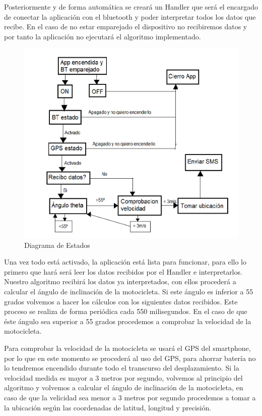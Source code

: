 		Posteriormente y de forma automática se creará un Handler que será el encargado de conectar la aplicación con el bluetooth y poder interpretar todos los datos que recibe. En el caso de no estar emparejado el dispositivo no recibiremos datos y por tanto la aplicación no ejecutará el algoritmo implementado.
		
		\begin{figure}[h]
			\centering
			\includegraphics{imagenes/DiagramaEstados.png}
			\caption{Diagrama de Estados}
			\label{contexto:figura}
		\end{figure}
		
		Una vez todo está activado, la aplicación está lista para funcionar, para ello lo primero que hará será leer los datos recibidos por el Handler e interpretarlos. Nuestro algoritmo recibirá los datos ya interpretados, con ellos procederá a calcular el ángulo de inclinación de la motocicleta. Si este ángulo es inferior a 55 grados volvemos a hacer los cálculos con los siguientes datos recibidos. Este proceso se realiza de forma periódica cada 550 milisegundos. En el caso de que éste ángulo sea superior a 55 grados procedemos a comprobar la velocidad de la motocicleta.
		
		Para comprobar la velocidad de la motocicleta se usará el GPS del smartphone, por lo que en este momento se procederá al uso del GPS, para ahorrar batería no lo tendremos encendido durante todo el transcurso del desplazamiento. Si la velocidad medida es mayor a 3 metros por segundo, volvemos al principio del algoritmo y volvemos a calcular el ángulo de inclinación de la motocicleta, en caso de que la velicidad sea menor a 3 metros por segundo procedemos a tomar a la ubicación según las coordenadas de latitud, longitud y precisión.
		
